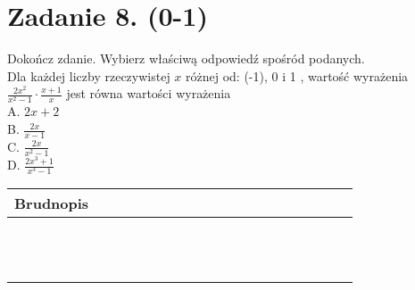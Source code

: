 \documentclass[10pt]{article}
\begin{document}
\section*{Zadanie 8. (0-1)}
Dokończ zdanie. Wybierz właściwą odpowiedź spośród podanych.\\
Dla każdej liczby rzeczywistej \(x\) różnej od: (-1), 0 i 1 , wartość wyrażenia \(\frac{2 x^{2}}{x^{2}-1} \cdot \frac{x+1}{x}\) jest równa wartości wyrażenia\\
A. \(2 x+2\)\\
B. \(\frac{2 x}{x-1}\)\\
C. \(\frac{2 x}{x^{2}-1}\)\\
D. \(\frac{2 x^{3}+1}{x^{3}-1}\)

\begin{center}
\begin{tabular}{|c|c|c|c|c|c|c|c|c|c|c|c|c|c|c|c|c|c|c|c|c|c|c|}
\hline
\multicolumn{5}{|l|}{Brudnopis} &  &  &  &  &  &  &  &  &  &  &  &  &  &  &  &  &  &  \\
\hline
 &  &  &  &  &  &  &  &  &  &  &  &  &  &  &  &  &  &  &  &  &  &  \\
\hline
 &  &  &  &  &  &  &  &  &  &  &  &  &  &  &  &  &  &  &  &  &  &  \\
\hline
 &  &  &  &  &  &  &  &  &  &  &  &  &  &  &  &  &  &  &  &  &  &  \\
\hline
 &  &  &  &  &  &  &  &  &  &  &  &  &  &  &  &  &  &  &  &  &  &  \\
\hline
 &  &  &  &  &  &  &  &  &  &  &  &  &  &  &  &  &  &  &  &  &  &  \\
\hline
 &  &  &  &  &  &  &  &  &  &  &  &  &  &  &  &  &  &  &  &  &  &  \\
\hline
 &  &  &  &  &  &  &  &  &  &  &  &  &  &  &  &  &  &  &  &  &  &  \\
\hline
 &  &  &  &  &  &  &  &  &  &  &  &  &  &  &  &  &  &  &  &  &  &  \\
\hline
 &  &  &  &  &  &  &  &  &  &  &  &  &  &  &  &  &  &  &  &  &  &  \\
\hline
 &  &  &  &  &  &  &  &  &  &  &  &  &  &  &  &  &  &  &  &  &  &  \\
\hline
 &  &  &  &  &  &  &  &  &  &  &  &  &  &  &  &  &  &  &  &  &  &  \\
\hline
 &  &  &  &  &  &  &  &  &  &  &  &  &  &  &  &  &  &  &  &  &  &  \\
\hline
\end{tabular}
\end{center}
\end{document}
